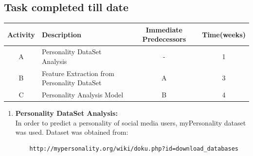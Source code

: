 \documentclass[a4paper, 12pt, onepage]{article}
\begin{document}
      \subsection{Task completed till date}
	\begin{center}
		\begin{tabular}{|c|l|c|c|}
			\hline
				Activity & Description & Immediate Predecessors&Time(weeks)\\
			\hline
			A&Personality DataSet Analysis&-&1\\
			\hline
			B&Feature Extraction from Personality DataSet&A&3\\
			\hline
			C&Personality Analysis Model&B&4\\
			\hline
		\end{tabular}
	\end{center}
	\begin{enumerate}
		\item \textbf{Personality DataSet Analysis:}\\
			In order to predict a personality of social media users, myPersonality dataset was used. Dataset was obtained from: 
	\begin{verbatim}
	http://mypersonality.org/wiki/doku.php?id=download_databases 
		\end{verbatim}


\end{enumerate}
\end{document}
